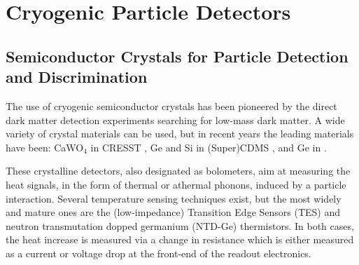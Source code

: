 


\section{Cryogenic Particle Detectors}
\label{sec:detector-principle}

\subsection{Semiconductor Crystals for Particle Detection and Discrimination}

The use of cryogenic semiconductor crystals has been pioneered by the direct dark matter  detection experiments searching for low-mass dark matter. 
A wide variety of crystal materials can be used, but in recent years the leading materials have been: CaWO$_4$ in CRESST \cite{Abdelhameed:2019hmk}, Ge and Si in (Super)CDMS \cite{Agnese:2013ixa}, and Ge in \Edelweiss{} \cite{Armengaud:2017rzu}.

These crystalline detectors, also designated as bolometers, aim at measuring the heat signals, in the form of thermal or athermal phonons, induced by a particle interaction.
Several temperature sensing techniques exist, but the most widely and mature ones are the (low-impedance) Transition Edge Sensors (TES) and neutron transmutation dopped germanium (NTD-Ge) thermistors. In both cases, the heat increase is measured via a change in resistance which is either measured as a current or voltage drop at the front-end of the readout electronics.

